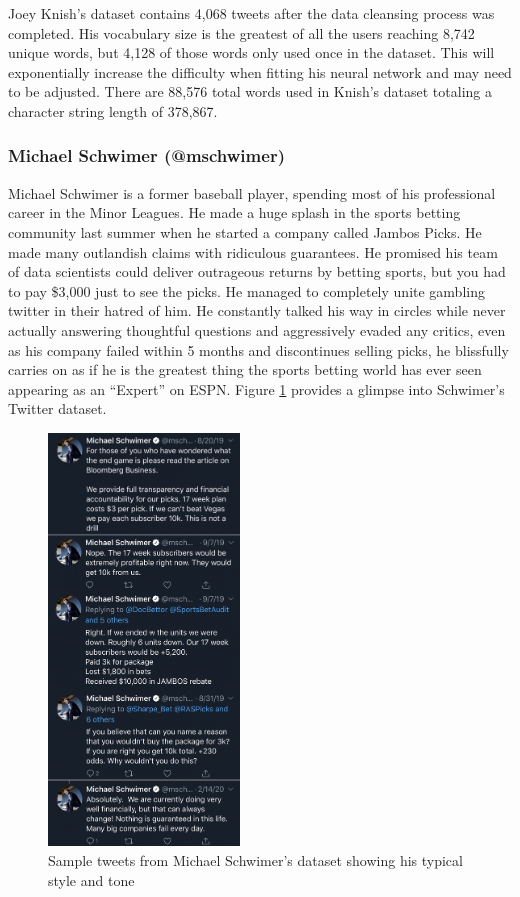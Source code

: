 \documentclass[5p,authoryear]{elsarticle}
\begin{document}
Joey Knish’s dataset contains 4,068 tweets after the data cleansing process was completed. His vocabulary size is the greatest of all the users reaching 8,742 unique words, but 4,128 of those words only used once in the dataset. This will exponentially increase the difficulty when fitting his neural network and may need to be adjusted. There are 88,576 total words used in Knish’s dataset totaling a character string length of 378,867.



\subsubsection{Michael Schwimer (@mschwimer)}\label{swim}

Michael Schwimer is a former baseball player, spending most of his professional career in the Minor Leagues. He made a huge splash in the sports betting community last summer when he started a company called Jambos Picks. He made many outlandish claims with ridiculous guarantees. He promised his team of data scientists could deliver outrageous returns by betting sports, but you had to pay \$3,000 just to see the picks. He managed to completely unite gambling twitter in their hatred of him. He constantly talked his way in circles while never actually answering thoughtful questions and aggressively evaded any critics, even as his company failed within 5 months and discontinues selling picks, he blissfully carries on as if he is the greatest thing the sports betting world has ever seen appearing as an “Expert” on ESPN. Figure \ref{tweet swim} provides a glimpse into Schwimer’s Twitter dataset.  

\begin{figure}[!htb] \centering
	\includegraphics[width=2.0in]{figures/tweet_swim.png}
	\caption[]{Sample tweets from Michael Schwimer's dataset showing his typical style and tone} 
	\label{tweet swim} 
\end{figure}
\end{document}
